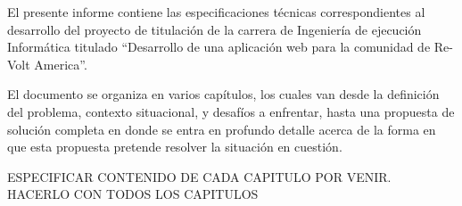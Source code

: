 El presente informe contiene las especificaciones técnicas correspondientes al desarrollo del proyecto de titulación de la carrera de Ingeniería de ejecución Informática titulado “Desarrollo de una aplicación web para la comunidad de Re-Volt America”.

El documento se organiza en varios capítulos, los cuales van desde la definición del problema, contexto situacional, y desafíos a enfrentar, hasta una propuesta de solución completa en donde se entra en profundo detalle acerca de la forma en que esta propuesta pretende resolver la situación en cuestión.

ESPECIFICAR CONTENIDO DE CADA CAPITULO POR VENIR. HACERLO CON TODOS LOS CAPITULOS
